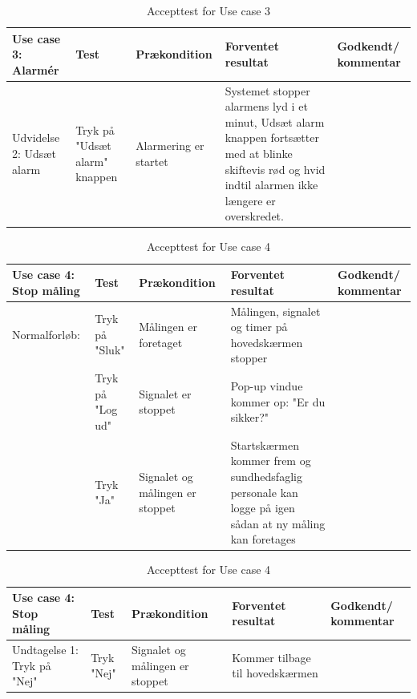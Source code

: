 \begin{table}[H]
\caption{Accepttest for Use case 3}\label{tab:tabel15}
\begin{tabular}{|>{\raggedright\arraybackslash}p{2.5cm}| >{\raggedright\arraybackslash}p{2.9cm} | >{\raggedright\arraybackslash}p{2.9cm} | >{\raggedright\arraybackslash}p{2.9cm} | >{\raggedright\arraybackslash}p{2.8cm} |}
   \hline
   \textbf{Use case 3: Alarmér } &\textbf{Test}& \textbf{Prækondition} & \textbf{Forventet resultat} & \textbf{Godkendt/ kommentar}\\ \hline
   Udvidelse 2: Udsæt alarm & Tryk på "Udsæt alarm" knappen & Alarmering er startet & Systemet stopper alarmens lyd i et minut, Udsæt alarm knappen fortsætter med at blinke skiftevis rød og hvid indtil alarmen ikke længere er overskredet.  &\\\hline
\end{tabular}
\end{table}

\begin{table}[H]
\caption{Accepttest for Use case 4}\label{tab:tabel16}
\begin{tabular}{|>{\raggedright\arraybackslash}p{2.5cm}| >{\raggedright\arraybackslash}p{2.9cm} | >{\raggedright\arraybackslash}p{2.9cm} | >{\raggedright\arraybackslash}p{2.9cm} | >{\raggedright\arraybackslash}p{2.8cm} |}
   \hline
   \textbf{Use case 4: Stop måling } &\textbf{Test}& \textbf{Prækondition} & \textbf{Forventet resultat} & \textbf{Godkendt/ kommentar}\\ \hline
   Normalforløb:& Tryk på "Sluk" & Målingen er foretaget & Målingen, signalet og timer på hovedskærmen stopper &\\\hline
   & Tryk på "Log ud" & Signalet er stoppet & Pop-up vindue kommer op: "Er du sikker?" &\\\hline
   &Tryk "Ja"&Signalet og målingen er stoppet& Startskærmen kommer frem og sundhedsfaglig personale kan logge på igen sådan at ny måling kan foretages &\\\hline
\end{tabular}
\end{table}

\begin{table}[H]
\caption{Accepttest for Use case 4}\label{tab:tabel17}
\begin{tabular}{|>{\raggedright\arraybackslash}p{2.5cm}| >{\raggedright\arraybackslash}p{2.9cm} | >{\raggedright\arraybackslash}p{2.9cm} | >{\raggedright\arraybackslash}p{2.9cm} | >{\raggedright\arraybackslash}p{2.8cm} |}
   \hline
   \textbf{Use case 4: Stop måling } &\textbf{Test}& \textbf{Prækondition} & \textbf{Forventet resultat} & \textbf{Godkendt/ kommentar}\\ \hline
Undtagelse 1: Tryk på "Nej" &Tryk "Nej" & Signalet og målingen er stoppet & Kommer tilbage til hovedskærmen &\\\hline
\end{tabular}
\end{table}
\newpage
\newpage
\newpage
